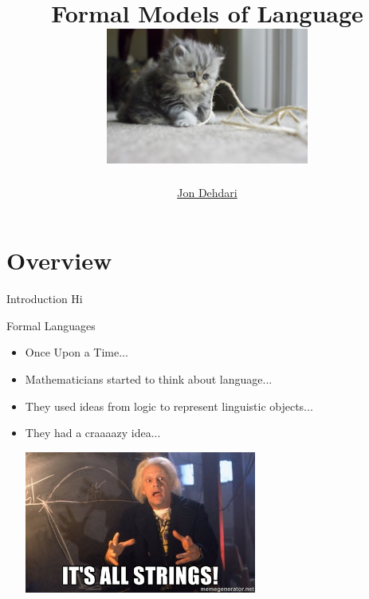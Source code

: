 \documentclass{beamer}
\begin{document}
\title{Formal Models of Language \\[1.5em]
 \includegraphics[width=0.5\textwidth]{images/kitten_string_flickr_albaraa.jpg} \\[-1.0em]
 }
\author{\href{http://jon.dehdari.org}{Jon Dehdari}}
\frame{\titlepage}

\section{Overview}
\begin{frame}{Introduction}
Hi
\end{frame}

\begin{frame}{Formal Languages}
\begin{block}{}
\begin{itemize}
	\item Once Upon a Time...
	\pause
	\item Mathematicians started to think about language...
	\pause
	\item They used ideas from logic to represent linguistic objects...
	\pause
	\item They had a craaaazy idea... \\
	\pause
	\begin{center}
	\includegraphics[width=0.6\textwidth]{images/doc_brown_strings.jpg}
	\end{center}
\end{itemize}
\end{block}
\end{frame}
\end{document}
